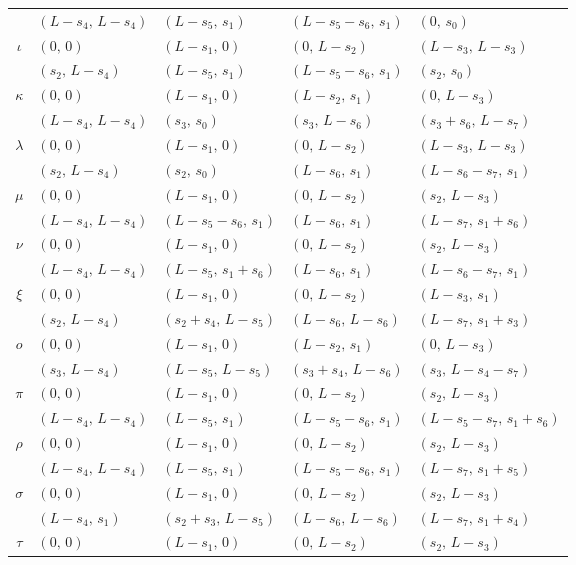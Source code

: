 \documentclass[12pt]{amsart}
\theoremstyle{definition}
\theoremstyle{remark}
\numberwithin{equation}{section}
\numberwithin{figure}{section}
\numberwithin{table}{section}
\newcommand{\omicron}{o}
\begin{document}
\begin{longtable}{c@{\qquad}llll}
 & $(L-s_4,\,L-s_4)$ & $(L-s_5,\,s_1)$ & $(L-s_5-s_6,\,s_1)$ & $(0,\,s_0)$ \\[1.2pt]
$\iota$ & $(0,\,0)$ & $(L-s_1,\,0)$ & $(0,\,L-s_2)$ & $(L-s_3,\,L-s_3)$ \\*
 & $(s_2,\,L-s_4)$ & $(L-s_5,\,s_1)$ & $(L-s_5-s_6,\,s_1)$ & $(s_2,\,s_0)$ \\[1.2pt]
$\kappa$ & $(0,\,0)$ & $(L-s_1,\,0)$ & $(L-s_2,\,s_1)$ & $(0,\,L-s_3)$ \\*
 & $(L-s_4,\,L-s_4)$ & $(s_3,\,s_0)$ & $(s_3,\,L-s_6)$ & $(s_3+s_6,\,L-s_7)$ \\[1.2pt]
$\lambda$ & $(0,\,0)$ & $(L-s_1,\,0)$ & $(0,\,L-s_2)$ & $(L-s_3,\,L-s_3)$ \\*
 & $(s_2,\,L-s_4)$ & $(s_2,\,s_0)$ & $(L-s_6,\,s_1)$ & $(L-s_6-s_7,\,s_1)$ \\[1.2pt]
$\mu$ & $(0,\,0)$ & $(L-s_1,\,0)$ & $(0,\,L-s_2)$ & $(s_2,\,L-s_3)$ \\*
 & $(L-s_4,\,L-s_4)$ & $(L-s_5-s_6,\,s_1)$ & $(L-s_6,\,s_1)$ & $(L-s_7,\,s_1+s_6)$ \\[1.2pt]
$\nu$ & $(0,\,0)$ & $(L-s_1,\,0)$ & $(0,\,L-s_2)$ & $(s_2,\,L-s_3)$ \\*
 & $(L-s_4,\,L-s_4)$ & $(L-s_5,\,s_1+s_6)$ & $(L-s_6,\,s_1)$ & $(L-s_6-s_7,\,s_1)$ \\[1.2pt]
$\xi$ & $(0,\,0)$ & $(L-s_1,\,0)$ & $(0,\,L-s_2)$ & $(L-s_3,\,s_1)$ \\*
 & $(s_2,\,L-s_4)$ & $(s_2+s_4,\,L-s_5)$ & $(L-s_6,\,L-s_6)$ & $(L-s_7,\,s_1+s_3)$ \\[1.2pt]
$\omicron$ & $(0,\,0)$ & $(L-s_1,\,0)$ & $(L-s_2,\,s_1)$ & $(0,\,L-s_3)$ \\*
 & $(s_3,\,L-s_4)$ & $(L-s_5,\,L-s_5)$ & $(s_3+s_4,\,L-s_6)$ & $(s_3,\,L-s_4-s_7)$ \\[1.2pt]
$\pi$ & $(0,\,0)$ & $(L-s_1,\,0)$ & $(0,\,L-s_2)$ & $(s_2,\,L-s_3)$ \\*
 & $(L-s_4,\,L-s_4)$ & $(L-s_5,\,s_1)$ & $(L-s_5-s_6,\,s_1)$ & $(L-s_5-s_7,\,s_1+s_6)$ \\[1.2pt]
$\rho$ & $(0,\,0)$ & $(L-s_1,\,0)$ & $(0,\,L-s_2)$ & $(s_2,\,L-s_3)$ \\*
 & $(L-s_4,\,L-s_4)$ & $(L-s_5,\,s_1)$ & $(L-s_5-s_6,\,s_1)$ & $(L-s_7,\,s_1+s_5)$ \\[1.2pt]
$\sigma$ & $(0,\,0)$ & $(L-s_1,\,0)$ & $(0,\,L-s_2)$ & $(s_2,\,L-s_3)$ \\*
 & $(L-s_4,\,s_1)$ & $(s_2+s_3,\,L-s_5)$ & $(L-s_6,\,L-s_6)$ & $(L-s_7,\,s_1+s_4)$ \\[1.2pt]
$\tau$ & $(0,\,0)$ & $(L-s_1,\,0)$ & $(0,\,L-s_2)$ & $(s_2,\,L-s_3)$ \\*

\end{longtable}
\end{document}
